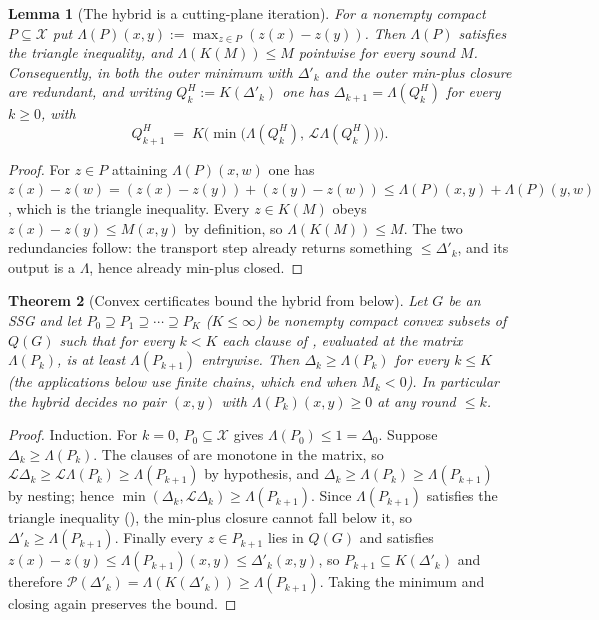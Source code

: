 \documentclass[11pt]{article}
\theoremstyle{plain}
\newtheorem{theorem}{Theorem}[section]
\newtheorem{lemma}[theorem]{Lemma}
\theoremstyle{definition}
\begin{document}
\begin{lemma}[The hybrid is a cutting-plane iteration]\label{lem:hybrid-cutting}
For a nonempty compact $P\subseteq\mathcal X$ put
$\Lambda(P)(x,y):=\max_{z\in P}(z(x)-z(y))$. Then $\Lambda(P)$ satisfies the
triangle inequality, and $\Lambda(K(M))\le M$ pointwise for every sound $M$.
Consequently, in  both the outer minimum with $\Delta'_k$ and
the outer min-plus closure are redundant, and writing $Q^H_k:=K(\Delta'_k)$ one
has $\Delta_{k+1}=\Lambda(Q^H_k)$ for every $k\ge0$, with
\[
  Q^H_{k+1}\;=\;K\bigl(\min\bigl(\Lambda(Q^H_k),\,
  \mathcal L\Lambda(Q^H_k)\bigr)\bigr).
\]
\end{lemma}

\begin{proof}
For $z\in P$ attaining $\Lambda(P)(x,w)$ one has
$z(x)-z(w)=(z(x)-z(y))+(z(y)-z(w))\le\Lambda(P)(x,y)+\Lambda(P)(y,w)$, which is
the triangle inequality. Every $z\in K(M)$ obeys $z(x)-z(y)\le M(x,y)$ by
definition, so $\Lambda(K(M))\le M$. The two redundancies follow: the transport
step already returns something $\le\Delta'_k$, and its output is a $\Lambda$,
hence already min-plus closed.
\end{proof}

\begin{theorem}[Convex certificates bound the hybrid from below]\label{thm:hybrid-convex-barrier}
Let $G$ be an SSG and let $P_0\supseteq P_1\supseteq\cdots\supseteq P_K$
($K\le\infty$) be nonempty compact convex subsets of $Q(G)$ such that for
every $k<K$ each clause of , evaluated at the matrix
$\Lambda(P_k)$, is at least $\Lambda(P_{k+1})$ entrywise. Then
$\Delta_k\ge\Lambda(P_k)$ for every $k\le K$ (the applications below use
finite chains, which end when $M_k<0$). In
particular the hybrid decides no pair $(x,y)$ with $\Lambda(P_k)(x,y)\ge0$ at
any round $\le k$.
\end{theorem}

\begin{proof}
Induction. For $k=0$, $P_0\subseteq\mathcal X$ gives $\Lambda(P_0)\le1=\Delta_0$.
Suppose $\Delta_k\ge\Lambda(P_k)$. The clauses of  are monotone
in the matrix, so $\mathcal L\Delta_k\ge\mathcal L\Lambda(P_k)\ge\Lambda(P_{k+1})$
by hypothesis, and $\Delta_k\ge\Lambda(P_k)\ge\Lambda(P_{k+1})$ by nesting;
hence $\min(\Delta_k,\mathcal L\Delta_k)\ge\Lambda(P_{k+1})$. Since
$\Lambda(P_{k+1})$ satisfies the triangle inequality
(), the min-plus closure cannot fall below it, so
$\Delta'_k\ge\Lambda(P_{k+1})$. Finally every $z\in P_{k+1}$ lies in $Q(G)$ and
satisfies $z(x)-z(y)\le\Lambda(P_{k+1})(x,y)\le\Delta'_k(x,y)$, so
$P_{k+1}\subseteq K(\Delta'_k)$ and therefore
$\mathcal P(\Delta'_k)=\Lambda(K(\Delta'_k))\ge\Lambda(P_{k+1})$. Taking the
minimum and closing again preserves the bound.
\end{proof}
\end{document}
